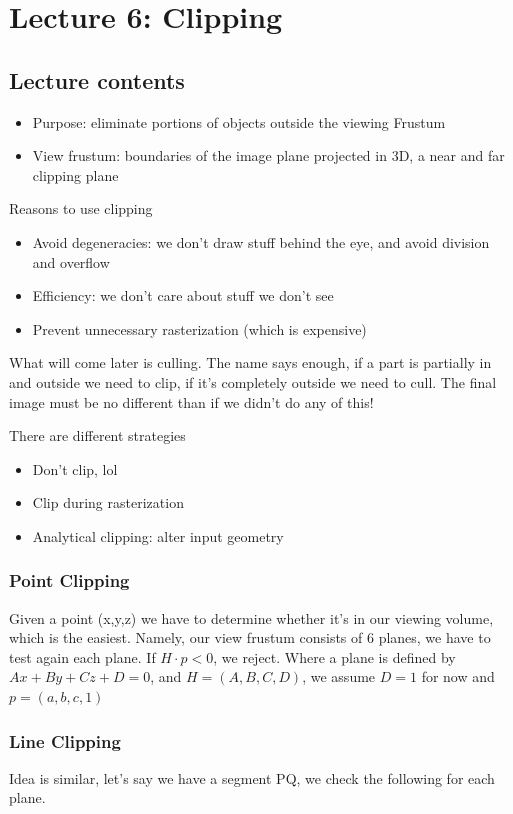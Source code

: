 \documentclass[11pt]{article}
\begin{document}
\section{Lecture 6: Clipping}
\subsection*{Lecture contents}
\begin{itemize}
    \item Purpose: eliminate portions of objects outside the viewing Frustum
    \item View frustum: boundaries of the image plane projected in 3D, a near and far clipping plane
\end{itemize}

Reasons to use clipping
\begin{itemize}
    \item Avoid degeneracies: we don't draw stuff behind the eye, and avoid division and overflow
    \item Efficiency: we don't care about stuff we don't see
    \item Prevent unnecessary rasterization (which is expensive)
\end{itemize}

What will come later is culling. The name says enough, if a part is partially in and outside we need to clip, if it's completely outside we need to cull. The final image must be no different than if we didn't do any of this!

There are different strategies
\begin{itemize}
    \item Don't clip, lol
    \item Clip during rasterization
    \item Analytical clipping: alter input geometry
\end{itemize}

\subsubsection*{Point Clipping}
Given a point (x,y,z) we have to determine whether it's in our viewing volume, which is the easiest.
Namely, our view frustum consists of 6 planes, we have to test again each plane. If $H\cdot p < 0$, we reject. Where a plane is defined by $Ax + By + Cz +D  = 0 $, and $H = (A,B,C,D)$, we assume $D = 1$ for now and $p = (a,b,c,1)$   

\subsubsection*{Line Clipping}
Idea is similar, let's say we have a segment PQ, we check the following for each plane.
\end{document}
